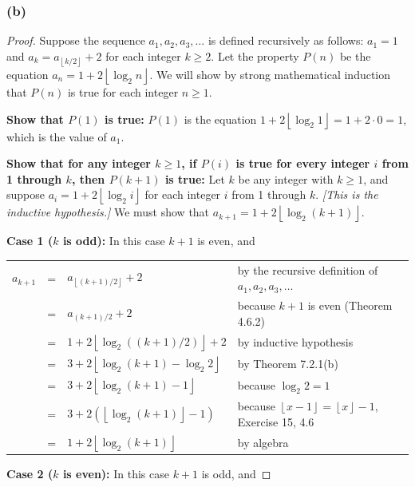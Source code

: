 \documentclass[14pt]{extarticle}
\newcommand{\cy}{\color{cyan}}
\newcommand{\floor}[1]{{\left\lfloor#1\right\rfloor}}
\begin{document}
\subsubsection{(b)}
\begin{proof}
Suppose the sequence \(a_1, a_2, a_3, \ldots\) is defined recursively as follows: \(a_1 = 1\) and \(a_k = 
a_{\floor{k/2}} + 2\) for each integer \(k \geq 2\). Let the property \(P(n)\) be the equation \(a_n = 1 + 2 
\floor{\log_2 n}\). We will show by strong mathematical induction that \(P(n)\) is true for each integer \(n \geq 1\). 

{\bf Show that \(P(1)\) is true:} \(P(1)\) is the equation \(1 + 2 \floor{\log_2 1} = 1 + 2 \cdot 0 = 1\), which is the value 
of \(a_1\). 

{\bf Show that for any integer \(k \geq 1\), if \(P(i)\) is true for every integer \(i\) from 1 through \(k\), then 
\(P(k + 1)\) is true:} Let \(k\) be any integer with \(k \geq 1\), and suppose \(a_i = 1 + 2 \floor{\log_2 i}\) for each 
integer \(i\) from 1 through \(k\). {\it [This is the inductive hypothesis.]} We must show that \(a_{k+1} = 1 + 2 
\floor{\log_2 (k + 1)}\). 

{\bf Case 1 (\(k\) is odd):} In this case \(k + 1\) is even, and 

\begin{tabular}{rcll}
\(a_{k+1}\) & = & \(a_{\floor{(k+1)/2}} + 2\) & {\cy by the recursive definition of \(a_1, a_2, a_3, \ldots\)} \\
& = & \(a_{(k+1)/2} + 2\) & {\cy because \(k + 1\) is even (Theorem 4.6.2)} \\
& = & \(1 + 2\floor{\log_2((k + 1)/2)} + 2\) & {\cy by inductive hypothesis} \\
& = & \(3 + 2\floor{\log_2(k + 1) - \log_2 2}\) & {\cy by Theorem 7.2.1(b)} \\
& = & \(3 + 2\floor{\log_2(k + 1) - 1}\) & {\cy because \(\log_2 2 = 1\)} \\
& = & \(3 + 2(\floor{\log_2(k + 1)} - 1)\) & {\cy because \(\floor{x-1} = \floor{x}-1\), Exercise 15, 4.6} \\
& = & \(1 + 2\floor{\log_2(k + 1)}\) & {\cy by algebra} \\
\end{tabular}

{\bf Case 2 (\(k\) is even):} In this case \(k + 1\) is odd, and 


\end{proof}
\end{document}
